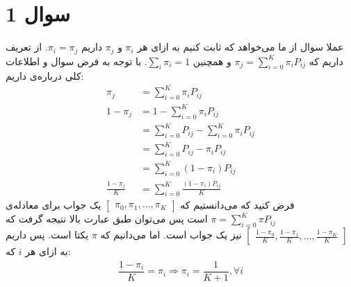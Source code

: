 \section*{سوال 1}

\noindent
عملا سوال از ما می‌خواهد که ثابت کنیم به ازای هر
$\pi_i$ و $\pi_j$
داریم
$\pi_i = \pi_j$.
از تعریف داریم که
$\pi_j=\sum \limits_{i=0}^K \pi_i P_{ij}$
و همچنین
$\sum \limits_i\pi_i=1$.
با توجه به فرض سوال و اطلاعات کلی درباره‌ی
داریم:
\begin{align*}
    \pi_j&=\sum \limits_{i=0}^K \pi_i P_{ij}\\
    1-\pi_j&=1-\sum \limits_{i=0}^K \pi_i P_{ij}\\
    &=\sum \limits_{i=0}^K P_{ij} - \sum \limits_{i=0}^K \pi_i P_{ij}\\
    &=\sum \limits_{i=0}^K P_{ij} - \pi_i P_{ij}\\
    &=\sum \limits_{i=0}^K (1 - \pi_i) P_{ij}\\
    \frac{1-\pi_j}{K}&=\sum \limits_{i=0}^K \frac{(1 - \pi_i) P_{ij}}{K}
\end{align*}
فرض کنید که می‌دانستیم که
$\left[\begin{smallmatrix}
    \pi_0,\pi_1,\dots, \pi_K
\end{smallmatrix}\right]$
یک جواب برای معادله‌ی
$\pi=\sum \limits_{i=0}^K \pi P_{ij}$
است پس می‌توان طبق عبارت بالا نتیجه گرفت که
$\left[\begin{smallmatrix}
    \frac{1 - \pi_0}{K},\frac{1 - \pi_1}{K},\dots, \frac{1 - \pi_K}{K}
\end{smallmatrix}\right]$
نیز یک جواب است. اما می‌دانیم که
$\pi$
یکتا است. پس داریم به ازای هر
$i$
که:
\begin{gather*}
    \dfrac{1-\pi_i}{K}=\pi_i\Rightarrow \pi_i=\dfrac{1}{K+1},\forall i
\end{gather*}